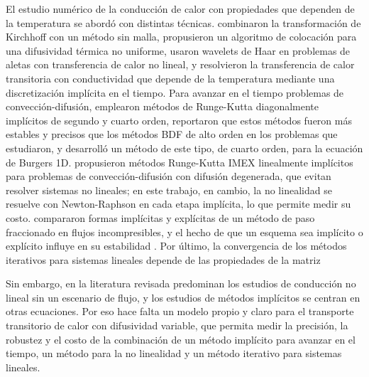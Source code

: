 \documentclass[final,5p,times,twocolumn,authoryear,11pt]{elsarticle}
\begin{document}
El estudio numérico de la conducción de calor con propiedades que dependen de la temperatura se abordó con distintas técnicas. \citet{Wang2022} combinaron la transformación de Kirchhoff con un método sin malla, \citet{Ejaz2024} propusieron un algoritmo de colocación para una difusividad térmica no uniforme, \citet{Aznam2019} usaron wavelets de Haar en problemas de aletas con transferencia de calor no lineal, y \citet{Filipov2023} resolvieron la transferencia de calor transitoria con conductividad que depende de la temperatura mediante una discretización implícita en el tiempo. Para avanzar en el tiempo problemas de convección-difusión, \citet{Deng2014} emplearon métodos de Runge-Kutta diagonalmente implícitos de segundo y cuarto orden, \citet{Levy2022} reportaron que estos métodos fueron más estables y precisos que los métodos BDF de alto orden en los problemas que estudiaron, y \citet{Wang2015} desarrolló un método de este tipo, de cuarto orden, para la ecuación de Burgers 1D. \citet{Boscarino2015} propusieron métodos Runge-Kutta IMEX linealmente implícitos para problemas de convección-difusión con difusión degenerada, que evitan resolver sistemas no lineales; en este trabajo, en cambio, la no linealidad se resuelve con Newton-Raphson en cada etapa implícita, lo que permite medir su costo. \citet{Bevan2016} compararon formas implícitas y explícitas de un método de paso fraccionado en flujos incompresibles, y el hecho de que un esquema sea implícito o explícito influye en su estabilidad \citep{Butcher1996}. Por último, la convergencia de los métodos iterativos para sistemas lineales depende de las propiedades de la matriz \citep{Zhang2015}

Sin embargo, en la literatura revisada predominan los estudios de conducción no lineal sin un escenario de flujo, y los estudios de métodos implícitos se centran en otras ecuaciones. Por eso hace falta un modelo propio y claro para el transporte transitorio de calor con difusividad variable, que permita medir la precisión, la robustez y el costo de la combinación de un método implícito para avanzar en el tiempo, un método para la no linealidad y un método iterativo para sistemas lineales.
\end{document}
